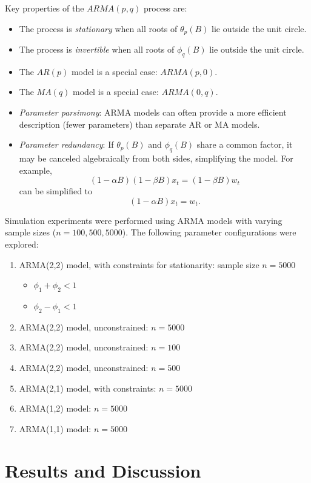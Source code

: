 \documentclass[12pt,a4paper]{article}
\begin{document}
Key properties of the $ARMA(p,q)$ process are:
\begin{itemize}
	\item The process is \textit{stationary} when all roots of $\theta_p(B)$ lie outside the unit circle.
	\item The process is \textit{invertible} when all roots of $\phi_q(B)$ lie outside the unit circle.
	\item The $AR(p)$ model is a special case: $ARMA(p,0)$.
	\item The $MA(q)$ model is a special case: $ARMA(0,q)$.
	\item \textit{Parameter parsimony}: ARMA models can often provide a more efficient description (fewer parameters) than separate AR or MA models.
	\item \textit{Parameter redundancy}: If $\theta_p(B)$ and $\phi_q(B)$ share a common factor, it may be canceled algebraically from both sides, simplifying the model. For example,
	\[
	(1 - \alpha B)(1 - \beta B)x_t = (1 - \beta B)w_t
	\]
	can be simplified to
	\[
	(1 - \alpha B)x_t = w_t.
	\]
\end{itemize}

Simulation experiments were performed using ARMA models with varying sample sizes ($n = 100, 500, 5000$). The following parameter configurations were explored:
\begin{enumerate}
	\item ARMA(2,2) model, with constraints for stationarity: sample size $n = 5000$
	\begin{itemize}
		\item $\phi_1 + \phi_2 < 1$
		\item $\phi_2 - \phi_1 < 1$
	\end{itemize}
	\item ARMA(2,2) model, unconstrained: $n = 5000$
	\item ARMA(2,2) model, unconstrained: $n = 100$
	\item ARMA(2,2) model, unconstrained: $n = 500$
	\item ARMA(2,1) model, with constraints: $n = 5000$
	\item ARMA(1,2) model: $n = 5000$
	\item ARMA(1,1) model: $n = 5000$
\end{enumerate}

\section{Results and Discussion}
\end{document}
